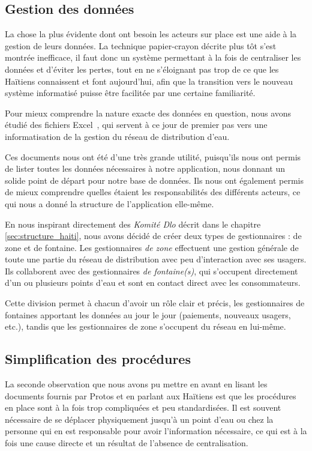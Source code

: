 \documentclass{EPL-master-thesis-covers-FR}
\begin{document}
			\subsection*{Gestion des données}
				\label{sec:gest_donnee}

				La chose la plus évidente dont ont besoin les acteurs sur place est une aide à la gestion de leurs données. La technique papier-crayon décrite plus tôt s'est montrée inefficace, il faut donc un système permettant à la fois de centraliser les données et d'éviter les pertes, tout en ne s'éloignant pas trop de ce que les Haïtiens connaissent et font aujourd'hui, afin que la transition vers le nouveau système informatisé puisse être facilitée par une certaine familiarité.

				Pour mieux comprendre la nature exacte des données en question, nous avons étudié des fichiers Excel~\cite{ref:resumes_documents}, qui servent à ce jour de premier pas vers une informatisation de la gestion du réseau de distribution d'eau.

				Ces documents nous ont été d'une très grande utilité, puisqu'ils nous ont permis de lister toutes les données nécessaires à notre application, nous donnant un solide point de départ pour notre base de données. Ils nous ont également permis de mieux comprendre quelles étaient les responsabilités des différents acteurs, ce qui nous a donné la structure de l'application elle-même.

				En nous inspirant directement des \emph{Komité Dlo} décrit dans le chapitre \ref{sec:structure_haiti}, nous avons décidé de créer deux types de gestionnaires : de zone et de fontaine. Les gestionnaires \emph{de zone} effectuent une gestion générale de toute une partie du réseau de distribution avec peu d'interaction avec ses usagers. Ils collaborent avec des gestionnaires \emph{de fontaine(s)}, qui s'occupent directement d'un ou plusieurs points d'eau et sont en contact direct avec les consommateurs.

				Cette division permet à chacun d'avoir un rôle clair et précis, les gestionnaires de fontaines apportant les données au jour le jour (paiements, nouveaux usagers, etc.), tandis que les gestionnaires de zone s'occupent du réseau en lui-même.

			\subsection*{Simplification des procédures}

				La seconde observation que nous avons pu mettre en avant en lisant les documents fournis par Protos et en parlant aux Haïtiens est que les procédures en place sont à la fois trop compliquées et peu standardisées. Il est souvent nécessaire de se déplacer physiquement jusqu'à un point d'eau ou chez la personne qui en est responsable pour avoir l'information nécessaire, ce qui est à la fois une cause directe et un résultat de l'absence de centralisation.
\end{document}
